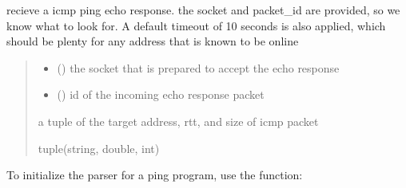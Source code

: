 \documentclass[letterpaper,10pt,english,openany,oneside]{sphinxmanual}
\begin{document}
\begin{fulllineitems}
\label{\detokenize{index:my_ping.receive_ping}}
\pysigstartsignatures
\pysiglinewithargsret
{}
{\sphinxparamcomma {}\sphinxparamcomma {}\sphinxparamcomma {}}
{}
\pysigstopsignatures
\sphinxAtStartPar
recieve a icmp ping echo response. the socket and packet\_id are provided, so we
know what to look for. A default timeout of 10 seconds is also applied, which should be plenty
for any address that is known to be online
\begin{quote}\begin{description}
\begin{itemize}
\item {} 
\sphinxAtStartPar
{} () \textendash{} the socket that is prepared to accept the echo response

\item {} 
\sphinxAtStartPar
{} () \textendash{} id of the incoming echo response packet

\end{itemize}

\sphinxAtStartPar
a tuple of the target address, rtt, and size of icmp packet

\sphinxAtStartPar
tuple(string, double, int)

\end{description}\end{quote}

\end{fulllineitems}


\sphinxAtStartPar
To initialize the parser for a ping program,
use the  function:
\end{document}
